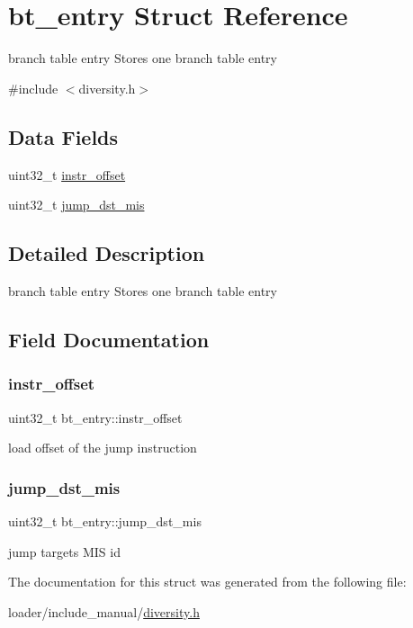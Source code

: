 \hypertarget{structbt__entry}{}\section{bt\+\_\+entry Struct Reference}
\label{structbt__entry}


branch table entry Stores one branch table entry  




{\ttfamily \#include $<$diversity.\+h$>$}

\subsection*{Data Fields}
\begin{DoxyCompactItemize}
\item 
uint32\+\_\+t \hyperlink{structbt__entry_adb75b3c3bfba190e293dfecffdd8ac32}{instr\+\_\+offset}
\item 
uint32\+\_\+t \hyperlink{structbt__entry_a035524209c467311b998c6407470fc21}{jump\+\_\+dst\+\_\+mis}
\end{DoxyCompactItemize}


\subsection{Detailed Description}
branch table entry Stores one branch table entry 

\subsection{Field Documentation}
\mbox{\label{structbt__entry_adb75b3c3bfba190e293dfecffdd8ac32}} 
\subsubsection{\texorpdfstring{instr\+\_\+offset}{instr\_offset}}
{\footnotesize\ttfamily uint32\+\_\+t bt\+\_\+entry\+::instr\+\_\+offset}

load offset of the jump instruction \mbox{\label{structbt__entry_a035524209c467311b998c6407470fc21}} 
\subsubsection{\texorpdfstring{jump\+\_\+dst\+\_\+mis}{jump\_dst\_mis}}
{\footnotesize\ttfamily uint32\+\_\+t bt\+\_\+entry\+::jump\+\_\+dst\+\_\+mis}

jump targets M\+IS id 

The documentation for this struct was generated from the following file\+:\begin{DoxyCompactItemize}
\item 
loader/include\+\_\+manual/\hyperlink{diversity_8h}{diversity.\+h}\end{DoxyCompactItemize}
